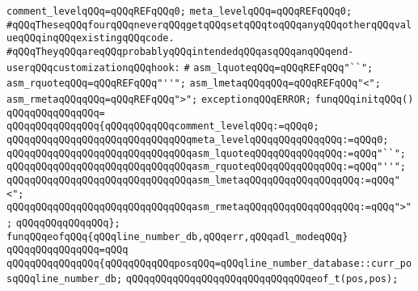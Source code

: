 \newline
\verb|comment_levelqQQq=qQQqREFqQQq0;|\newline
\verb|meta_levelqQQq=qQQqREFqQQq0;|\newline
\newline
\verb|#qQQqTheseqQQqfourqQQqneverqQQqgetqQQqsetqQQqtoqQQqanyqQQqotherqQQqvalueqQQqinqQQqexistingqQQqcode.|\newline
\verb|#qQQqTheyqQQqareqQQqprobablyqQQqintendedqQQqasqQQqanqQQqend-userqQQqcustomizationqQQqhook:|\newline
\verb|#|\newline
\verb|asm_lquoteqQQq=qQQqREFqQQq"``";|\newline
\verb|asm_rquoteqQQq=qQQqREFqQQq"''";|\newline
\verb|asm_lmetaqQQqqQQq=qQQqREFqQQq"<";|\newline
\verb|asm_rmetaqQQqqQQq=qQQqREFqQQq">";|\newline
\newline
\verb|exceptionqQQqERROR;|\newline
\newline
\verb|funqQQqinitqQQq()|\newline
\verb|qQQqqQQqqQQqqQQq=|\newline
\verb|qQQqqQQqqQQqqQQq{qQQqqQQqqQQqcomment_levelqQQq:=qQQq0;|\newline
\verb|qQQqqQQqqQQqqQQqqQQqqQQqqQQqqQQqmeta_levelqQQqqQQqqQQqqQQq:=qQQq0;|\newline
\verb|qQQqqQQqqQQqqQQqqQQqqQQqqQQqqQQqasm_lquoteqQQqqQQqqQQqqQQq:=qQQq"``";|\newline
\verb|qQQqqQQqqQQqqQQqqQQqqQQqqQQqqQQqasm_rquoteqQQqqQQqqQQqqQQq:=qQQq"''";|\newline
\verb|qQQqqQQqqQQqqQQqqQQqqQQqqQQqqQQqasm_lmetaqQQqqQQqqQQqqQQqqQQq:=qQQq"<";|\newline
\verb|qQQqqQQqqQQqqQQqqQQqqQQqqQQqqQQqasm_rmetaqQQqqQQqqQQqqQQqqQQq:=qQQq">";|\newline
\verb|qQQqqQQqqQQqqQQq};|\newline
\newline
\verb|funqQQqeofqQQq{qQQqline_number_db,qQQqerr,qQQqadl_modeqQQq}|\newline
\verb|qQQqqQQqqQQqqQQq=qQQq|\newline
\verb|qQQqqQQqqQQqqQQq{qQQqqQQqqQQqposqQQq=qQQqline_number_database::curr_posqQQqline_number_db;|\newline
\newline
\verb|qQQqqQQqqQQqqQQqqQQqqQQqqQQqqQQqeof_t(pos,pos);|\newline
